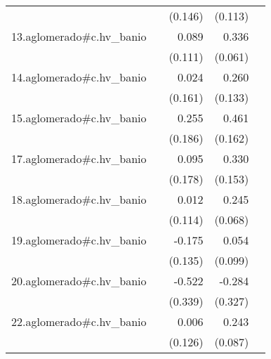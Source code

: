 {\begin{longtable}{l*{4}{D{.}{.}{-1}}}
            &                     &     (0.146)         &     (0.113)         &                     \\
\addlinespace
13.aglomerado#c.hv\_banio&                     &       0.089         &       0.336\sym{***}&                     \\
            &                     &     (0.111)         &     (0.061)         &                     \\
\addlinespace
14.aglomerado#c.hv\_banio&                     &       0.024         &       0.260         &                     \\
            &                     &     (0.161)         &     (0.133)         &                     \\
\addlinespace
15.aglomerado#c.hv\_banio&                     &       0.255         &       0.461\sym{**} &                     \\
            &                     &     (0.186)         &     (0.162)         &                     \\
\addlinespace
17.aglomerado#c.hv\_banio&                     &       0.095         &       0.330\sym{*}  &                     \\
            &                     &     (0.178)         &     (0.153)         &                     \\
\addlinespace
18.aglomerado#c.hv\_banio&                     &       0.012         &       0.245\sym{***}&                     \\
            &                     &     (0.114)         &     (0.068)         &                     \\
\addlinespace
19.aglomerado#c.hv\_banio&                     &      -0.175         &       0.054         &                     \\
            &                     &     (0.135)         &     (0.099)         &                     \\
\addlinespace
20.aglomerado#c.hv\_banio&                     &      -0.522         &      -0.284         &                     \\
            &                     &     (0.339)         &     (0.327)         &                     \\
\addlinespace
22.aglomerado#c.hv\_banio&                     &       0.006         &       0.243\sym{**} &                     \\
            &                     &     (0.126)         &     (0.087)         &                     \\

\end{longtable}}
